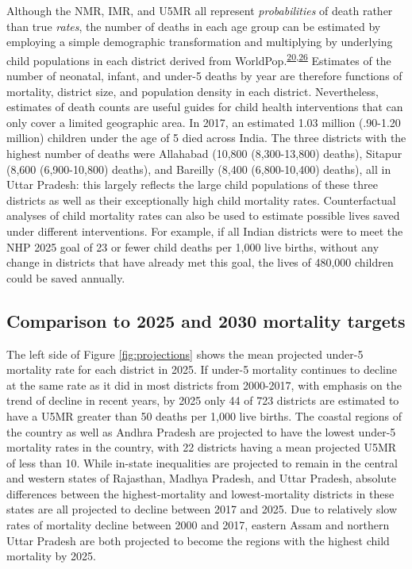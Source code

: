 \documentclass[
]{article}
\begin{document}
Although the NMR, IMR, and U5MR all represent \emph{probabilities} of death rather than true \emph{rates}, the number of deaths in each age group can be estimated by employing a simple demographic transformation and multiplying by underlying child populations in each district derived from WorldPop.\textsuperscript{\protect\hyperlink{ref-Burstein2019}{20},\protect\hyperlink{ref-Tatem2017}{26}} Estimates of the number of neonatal, infant, and under-5 deaths by year are therefore functions of mortality, district size, and population density in each district. Nevertheless, estimates of death counts are useful guides for child health interventions that can only cover a limited geographic area. In 2017, an estimated 1.03 million (.90-1.20 million) children under the age of 5 died across India. The three districts with the highest number of deaths were Allahabad (10,800 (8,300-13,800) deaths), Sitapur (8,600 (6,900-10,800) deaths), and Bareilly (8,400 (6,800-10,400) deaths), all in Uttar Pradesh: this largely reflects the large child populations of these three districts as well as their exceptionally high child mortality rates. Counterfactual analyses of child mortality rates can also be used to estimate possible lives saved under different interventions. For example, if all Indian districts were to meet the NHP 2025 goal of 23 or fewer child deaths per 1,000 live births, without any change in districts that have already met this goal, the lives of 480,000 children could be saved annually.

\hypertarget{comparison-to-2025-and-2030-mortality-targets}{%
\subsection{Comparison to 2025 and 2030 mortality targets}\label{comparison-to-2025-and-2030-mortality-targets}}

The left side of Figure \ref{fig:projections} shows the mean projected under-5 mortality rate for each district in 2025. If under-5 mortality continues to decline at the same rate as it did in most districts from 2000-2017, with emphasis on the trend of decline in recent years, by 2025 only 44 of 723 districts are estimated to have a U5MR greater than 50 deaths per 1,000 live births. The coastal regions of the country as well as Andhra Pradesh are projected to have the lowest under-5 mortality rates in the country, with 22 districts having a mean projected U5MR of less than 10. While in-state inequalities are projected to remain in the central and western states of Rajasthan, Madhya Pradesh, and Uttar Pradesh, absolute differences between the highest-mortality and lowest-mortality districts in these states are all projected to decline between 2017 and 2025. Due to relatively slow rates of mortality decline between 2000 and 2017, eastern Assam and northern Uttar Pradesh are both projected to become the regions with the highest child mortality by 2025.
\end{document}
